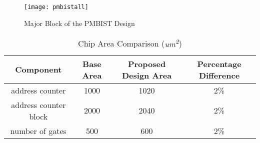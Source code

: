 
\begin{figure}[h]
  \centering
  \texttt{[image: pmbistall]}
  \caption{Major Block of the PMBIST Design}
  \label{fig:pmbistall}
\end{figure}

\begin{table}[ht]
\caption{Chip Area Comparison (\textit{um\textsuperscript{2}})}
\centering
\begin{tabular}{c c c c}
\hline\hline
Component & Base Area & Proposed Design Area & Percentage Difference \\ [0.5ex]
\hline
address counter       & 1000 & 1020 & 2\% \\
address counter block & 2000 & 2040 & 2\% \\ [1ex]
\hline\hline
number of gates       & 500  & 600  & 2\% \\ [1ex] 
\end{tabular}
\label{table:area_compare}
\end{table}

